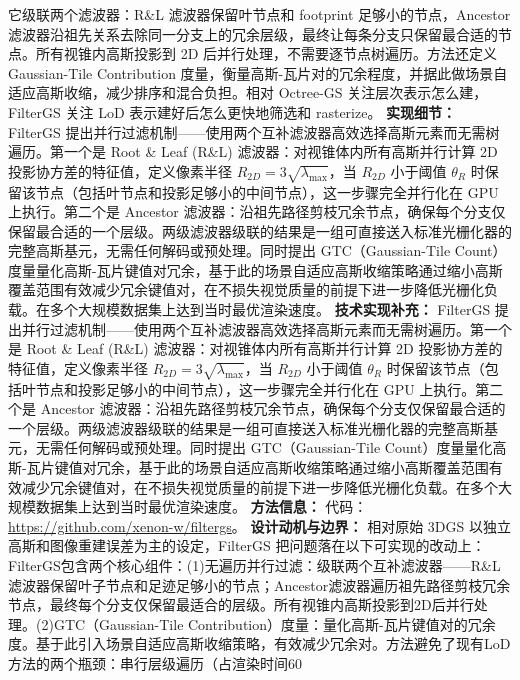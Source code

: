 它级联两个滤波器：R\&L 滤波器保留叶节点和 footprint 足够小的节点，Ancestor 滤波器沿祖先关系去除同一分支上的冗余层级，最终让每条分支只保留最合适的节点。所有视锥内高斯投影到 2D 后并行处理，不需要逐节点树遍历。方法还定义 Gaussian-Tile Contribution 度量，衡量高斯-瓦片对的冗余程度，并据此做场景自适应高斯收缩，减少排序和混合负担。相对 Octree-GS 关注层次表示怎么建，FilterGS 关注 LoD 表示建好后怎么更快地筛选和 rasterize。
\textbf{实现细节：} FilterGS 提出并行过滤机制——使用两个互补滤波器高效选择高斯元素而无需树遍历。第一个是 Root \& Leaf (R\&L) 滤波器：对视锥体内所有高斯并行计算 2D 投影协方差的特征值，定义像素半径 $R_{2D} = 3\sqrt{\lambda_{\max}}$，当 $R_{2D}$ 小于阈值 $\theta_R$ 时保留该节点（包括叶节点和投影足够小的中间节点），这一步骤完全并行化在 GPU 上执行。第二个是 Ancestor 滤波器：沿祖先路径剪枝冗余节点，确保每个分支仅保留最合适的一个层级。两级滤波器级联的结果是一组可直接送入标准光栅化器的完整高斯基元，无需任何解码或预处理。同时提出 GTC（Gaussian-Tile Count）度量量化高斯-瓦片键值对冗余，基于此的场景自适应高斯收缩策略通过缩小高斯覆盖范围有效减少冗余键值对，在不损失视觉质量的前提下进一步降低光栅化负载。在多个大规模数据集上达到当时最优渲染速度。
\textbf{技术实现补充：} FilterGS 提出并行过滤机制——使用两个互补滤波器高效选择高斯元素而无需树遍历。第一个是 Root \& Leaf (R\&L) 滤波器：对视锥体内所有高斯并行计算 2D 投影协方差的特征值，定义像素半径 $R_{2D} = 3\sqrt{\lambda_{\max}}$，当 $R_{2D}$ 小于阈值 $\theta_R$ 时保留该节点（包括叶节点和投影足够小的中间节点），这一步骤完全并行化在 GPU 上执行。第二个是 Ancestor 滤波器：沿祖先路径剪枝冗余节点，确保每个分支仅保留最合适的一个层级。两级滤波器级联的结果是一组可直接送入标准光栅化器的完整高斯基元，无需任何解码或预处理。同时提出 GTC（Gaussian-Tile Count）度量量化高斯-瓦片键值对冗余，基于此的场景自适应高斯收缩策略通过缩小高斯覆盖范围有效减少冗余键值对，在不损失视觉质量的前提下进一步降低光栅化负载。在多个大规模数据集上达到当时最优渲染速度。
\textbf{方法信息：} 代码：\url{https://github.com/xenon-w/filtergs}。
\textbf{设计动机与边界：} 相对原始 3DGS 以独立高斯和图像重建误差为主的设定，FilterGS 把问题落在以下可实现的改动上：FilterGS包含两个核心组件：(1)无遍历并行过滤：级联两个互补滤波器——R\&L滤波器保留叶子节点和足迹足够小的节点；Ancestor滤波器遍历祖先路径剪枝冗余节点，最终每个分支仅保留最适合的层级。所有视锥内高斯投影到2D后并行处理。(2)GTC（Gaussian-Tile Contribution）度量：量化高斯-瓦片键值对的冗余度。基于此引入场景自适应高斯收缩策略，有效减少冗余对。方法避免了现有LoD方法的两个瓶颈：串行层级遍历（占渲染时间60%


